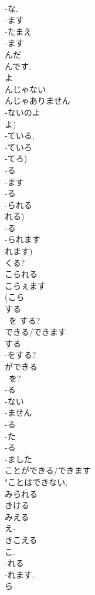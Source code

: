 \documentclass[8pt]{extreport}
\begin{document}
\begin{CJK}{UTF8}{min}
\\	-な. 
\\	-ます 
\\	-たまえ 
\\	-ます
\\	んだ 
\\	んです. 
\\	よ 
\\	んじゃない
\\	んじゃありません
\\	-ないのよ 
\\	よ)	
\\	-ている, 
\\	-ていろ 
\\	-てろ)	
\\	-る 
\\	-ます
\\	-る 
\\	-られる 
\\	れる)
\\	-る 
\\	-られます
\\	れます)
\\	くる?
\\	こられる
\\	こらぇます
\\	(こら 
\\	する 
\\	~を する?
\\	できる/できます	
\\	する 
\\	-をする?
\\	ができる	
\\	~を?
\\	-る 
\\	-ない 
\\	-ません 
\\	-る 
\\	-た 
\\	-る 
\\	-ました
\\	ことができる/できます 
\\	"ことはできない, 
\\	みられる 
\\	きける 
\\	みえる 
\\	え-
\\	きこえる 
\\	こ.
\\	-れる
\\	-れます.
\\	ら 

\end{CJK}
\end{document}

